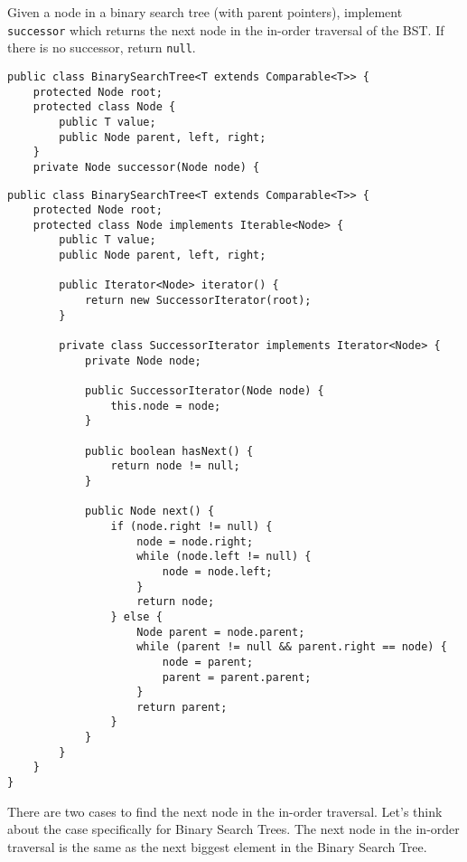 \begin{blocksection}
\question Given a node in a binary search tree (with parent pointers),
implement \lstinline$successor$ which returns the next node in the in-order
traversal of the BST. If there is no successor, return \lstinline$null$.

\ifprintanswers\else
\begin{lstlisting}
public class BinarySearchTree<T extends Comparable<T>> {
    protected Node root;
    protected class Node {
        public T value;
        public Node parent, left, right;
    }
    private Node successor(Node node) {
\end{lstlisting}
\fi
\end{blocksection}

\begin{solution}[2.5in]
\begin{lstlisting}
public class BinarySearchTree<T extends Comparable<T>> {
    protected Node root;
    protected class Node implements Iterable<Node> {
        public T value;
        public Node parent, left, right;
        
        public Iterator<Node> iterator() {
            return new SuccessorIterator(root);
        }
        
        private class SuccessorIterator implements Iterator<Node> {
            private Node node;
            
            public SuccessorIterator(Node node) {
                this.node = node;
            }
            
            public boolean hasNext() {
                return node != null;
            }
            
            public Node next() {
                if (node.right != null) {
                    node = node.right;
                    while (node.left != null) {
                        node = node.left;
                    }
                    return node;
                } else {
                    Node parent = node.parent;
                    while (parent != null && parent.right == node) {
                        node = parent;
                        parent = parent.parent;
                    }
                    return parent;
                }
            }
        }
    }
}
\end{lstlisting}

There are two cases to find the next node in the in-order traversal. Let's
think about the case specifically for Binary Search Trees. The next node in the
in-order traversal is the same as the next biggest element in the Binary Search
Tree.


\end{solution}
